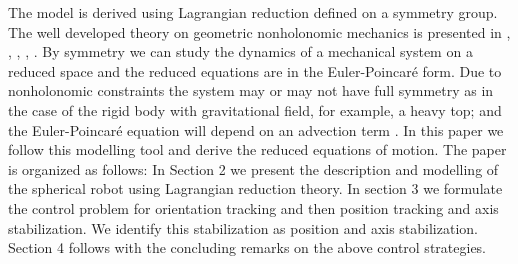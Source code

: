 \documentclass{ifacconf}
\begin{document}
The model is derived using Lagrangian reduction defined on a symmetry group. The well developed theory on geometric nonholonomic mechanics is presented in \citep{marsden}, \citep{CMR}, \citep{CHMR}, \citep{BKMM}, \citep{bloch2003}. By symmetry we can study the dynamics of a mechanical system on a reduced space and the reduced equations are in the Euler-Poincar\'{e} form. Due to nonholonomic constraints the system may or may not have full symmetry as in the case of the rigid body with gravitational field, for example, a heavy top; and the Euler-Poincar\'{e} equation will depend on an advection term \citep{schneider}. In this paper we follow this modelling tool and derive the reduced equations of motion. The paper is organized as follows: In Section 2 we present the description and modelling of the spherical robot using Lagrangian reduction theory. In section 3 we formulate the control problem for orientation tracking and then position tracking and axis stabilization. We identify this stabilization as position and axis stabilization. Section 4 follows with the concluding remarks on the above control strategies.
\end{document}
